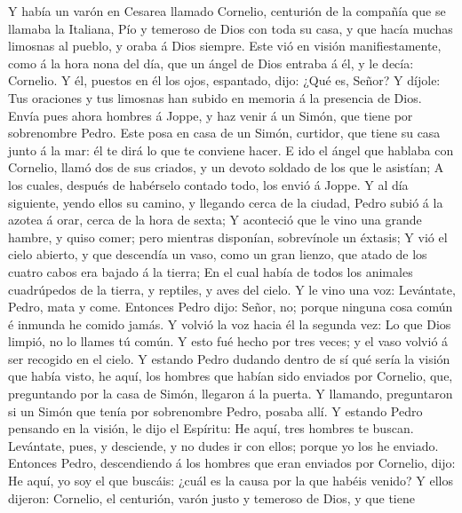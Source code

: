  Y había un varón en Cesarea llamado Cornelio, centurión
de la compañía que se llamaba la Italiana,  Pío y temeroso
de Dios con toda su casa, y que hacía muchas limosnas al pueblo, y oraba
á Dios siempre.  Este vió en visión manifiestamente, como
á la hora nona del día, que un ángel de Dios entraba á él, y le decía:
Cornelio.  Y él, puestos en él los ojos, espantado, dijo:
¿Qué es, Señor? Y díjole: Tus oraciones y tus limosnas han subido en
memoria á la presencia de Dios.  Envía pues ahora hombres
á Joppe, y haz venir á un Simón, que tiene por sobrenombre Pedro.
 Este posa en casa de un Simón, curtidor, que tiene su
casa junto á la mar: él te dirá lo que te conviene hacer. 
E ido el ángel que hablaba con Cornelio, llamó dos de sus criados, y un
devoto soldado de los que le asistían;  A los cuales,
después de habérselo contado todo, los envió á Joppe.  Y
al día siguiente, yendo ellos su camino, y llegando cerca de la ciudad,
Pedro subió á la azotea á orar, cerca de la hora de sexta;
 Y aconteció que le vino una grande hambre, y quiso
comer; pero mientras disponían, sobrevínole un éxtasis; 
Y vió el cielo abierto, y que descendía un vaso, como un gran lienzo,
que atado de los cuatro cabos era bajado á la tierra;  En
el cual había de todos los animales cuadrúpedos de la tierra, y
reptiles, y aves del cielo.  Y le vino una voz:
Levántate, Pedro, mata y come.  Entonces Pedro dijo:
Señor, no; porque ninguna cosa común é inmunda he comido jamás.
 Y volvió la voz hacia él la segunda vez: Lo que Dios
limpió, no lo llames tú común.  Y esto fué hecho por tres
veces; y el vaso volvió á ser recogido en el cielo.  Y
estando Pedro dudando dentro de sí qué sería la visión que había visto,
he aquí, los hombres que habían sido enviados por Cornelio, que,
preguntando por la casa de Simón, llegaron á la puerta. 
Y llamando, preguntaron si un Simón que tenía por sobrenombre Pedro,
posaba allí.  Y estando Pedro pensando en la visión, le
dijo el Espíritu: He aquí, tres hombres te buscan. 
Levántate, pues, y desciende, y no dudes ir con ellos; porque yo los he
enviado.  Entonces Pedro, descendiendo á los hombres que
eran enviados por Cornelio, dijo: He aquí, yo soy el que buscáis: ¿cuál
es la causa por la que habéis venido?  Y ellos dijeron:
Cornelio, el centurión, varón justo y temeroso de Dios, y que tiene
